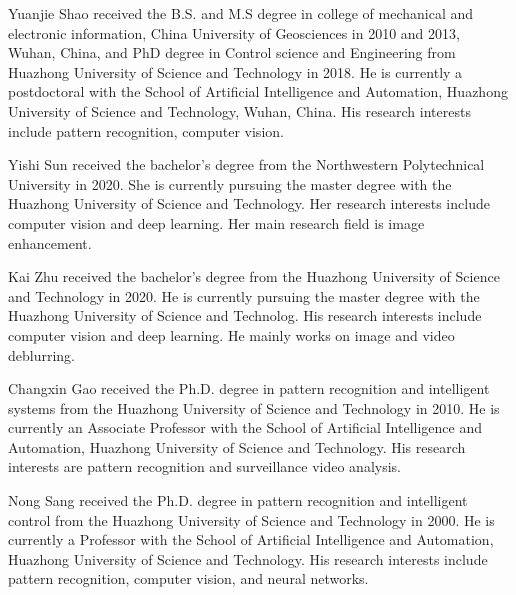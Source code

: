 \documentclass[journal]{IEEEtran}
\begin{document}
\begin{IEEEbiography}
{Yuanjie Shao}
received the B.S. and M.S degree in college of mechanical and electronic information, China University of Geosciences in 2010 and 2013, Wuhan, China, and PhD degree in Control science and Engineering from Huazhong University of Science and Technology in 2018. He is currently a postdoctoral with the School of Artificial Intelligence and Automation, Huazhong University of Science and Technology, Wuhan, China. His research interests include pattern recognition, computer vision.
\end{IEEEbiography}

\begin{IEEEbiography}
{Yishi Sun}
received the bachelor’s degree from the Northwestern Polytechnical University in 2020. She is currently pursuing the master degree with the Huazhong University of Science and Technology. Her research interests include computer vision and deep learning. Her main research field is image enhancement.
\end{IEEEbiography}

\begin{IEEEbiography}
{Kai Zhu}
received the bachelor’s degree from the Huazhong University of Science and Technology in 2020. He is currently pursuing the master degree with the Huazhong University of Science and Technolog. His research interests include computer vision and deep learning. He mainly works on image and video deblurring.
\end{IEEEbiography}

\begin{IEEEbiography}
{Changxin Gao}
received the Ph.D. degree in pattern recognition and intelligent systems from the Huazhong University of Science and Technology in 2010. He is currently an Associate Professor with the School of Artificial Intelligence and Automation, Huazhong University of Science and Technology. His research interests are pattern recognition and surveillance video analysis.
\end{IEEEbiography}

\begin{IEEEbiography}
{Nong Sang}
received the Ph.D. degree in pattern recognition and intelligent control from the Huazhong University of Science and Technology in 2000. He is currently a Professor with the School of Artificial Intelligence and Automation, Huazhong University of Science and Technology. His research interests include pattern recognition, computer vision, and neural networks.
\end{IEEEbiography}
\end{document}
